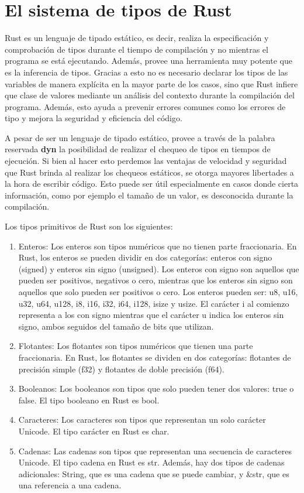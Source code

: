 \chapter{El sistema de tipos de Rust}

Rust es un lenguaje de tipado estático, es decir, realiza la especificación y comprobación de tipos durante el tiempo de compilación y no mientras el programa se está ejecutando. Además, provee una herramienta muy potente que es la inferencia de tipos. Gracias a esto no es necesario declarar los tipos de las variables de manera explícita en la mayor parte de los casos, sino que Rust infiere que clase de valores mediante un análisis del contexto durante la compilación del programa. Además, esto ayuda a prevenir errores comunes como los errores de tipo y mejora la seguridad y eficiencia del código.

A pesar de ser un lenguaje de tipado estático, provee a través de la palabra reservada \textbf{dyn} la posibilidad de realizar el chequeo de tipos en tiempos de ejecución. Si bien al hacer esto perdemos las ventajas de velocidad y seguridad que Rust brinda al realizar los chequeos estáticos, se otorga mayores libertades a la hora de escribir código. Esto puede ser útil especialmente en casos donde cierta información, como por ejemplo el tamaño de un valor, es desconocida durante la compilación.

Los tipos primitivos de Rust son los siguientes:
\begin{enumerate}
    \item Enteros: Los enteros son tipos numéricos que no tienen parte fraccionaria. En Rust, los enteros se pueden dividir en dos categorías: enteros con signo (signed) y enteros sin signo (unsigned). Los enteros con signo son aquellos que pueden ser positivos, negativos o cero, mientras que los enteros sin signo son aquellos que solo pueden ser positivos o cero. Los enteros pueden ser: u8, u16, u32, u64, u128, i8, i16, i32, i64, i128, isize y usize. El carácter i al comienzo representa a los con signo mientras que el carácter u indica los enteros sin signo, ambos seguidos del tamaño de bits que utilizan.
    \item  Flotantes: Los flotantes son tipos numéricos que tienen una parte fraccionaria. En Rust, los flotantes se dividen en dos categorías: flotantes de precisión simple (f32) y flotantes de doble precisión (f64).
    \item  Booleanos: Los booleanos son tipos que solo pueden tener dos valores: true o false. El tipo booleano en Rust es bool.
    \item  Caracteres: Los caracteres son tipos que representan un solo carácter Unicode. El tipo carácter en Rust es char.
    \item Cadenas: Las cadenas son tipos que representan una secuencia de caracteres Unicode. El tipo cadena en Rust es str. Además, hay dos tipos de cadenas adicionales: String, que es una cadena que se puede cambiar, y \&str, que es una referencia a una cadena.
\end{enumerate}

